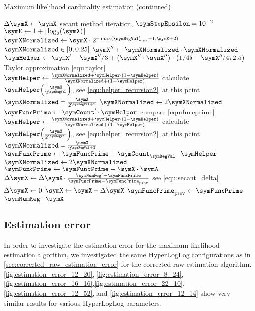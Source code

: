 \documentclass[a4paper]{scrartcl}
\begin{document}
\begin{algorithm}
\caption{Maximum likelihood cardinality estimation (continued)}
\begin{algorithmic}
\State $\Delta\symX \gets \symX$
\While{$\Delta\symX > \symX\cdot\symError$} \Comment secant method iteration, $\symStopEpsilon = 10^{-2}$
\State $\symE \gets 1+\lfloor\log_2(\symX)\rfloor$
\State $\symXNormalized \gets
\symX \cdot 2^{-\max(\symRegVal'_\text{max}+1, \symE+2)}$
\Comment $\symXNormalized \in [0, 0.25]$
\State $\symX''\gets \symXNormalized\cdot\symXNormalized$
\State $\symHelper \gets
\symX' - \symX''/3 + \left(\symX''\cdot \symX''\right)\cdot\left(1/45-\symX''/472.5\right)$
\Comment Taylor approximation \eqref{equ:taylor}
\State $\symHelper \gets \frac{\symXNormalized+\symHelper\cdot(1-\symHelper)}{\symXNormalized+(1-\symHelper)}$
\Comment calculate $\symHelper\!\left(\frac{\symX}{2^{\symRegVal}}\right)$, see \eqref{equ:helper_recursion2}, at this point $\symXNormalized = \frac{\symX}{2^{\symRegVal+2}}$
\State $\symXNormalized \gets 2\symXNormalized$
\EndFor
\State $\symFuncPrime \gets \symCount'\cdot\symHelper$
\Comment compare \eqref{equ:funcprime}
\State $\symHelper \gets \frac{\symXNormalized+\symHelper\cdot(1-\symHelper)}{\symXNormalized+(1-\symHelper)}$
\Comment calculate $\symHelper\!\left(\frac{\symX}{2^{\symRegVal}}\right)$, see \eqref{equ:helper_recursion2}, at this point $\symXNormalized = \frac{\symX}{2^{\symRegVal+2}}$
\State $\symFuncPrime\gets \symFuncPrime + \symCount_\symRegVal\cdot\symHelper$
\State $\symXNormalized \gets 2\symXNormalized$
\EndFor
\State $\symFuncPrime\gets \symFuncPrime + \symX\cdot\symA$
\State $\Delta\symX \gets \Delta\symX \cdot \frac{\symNumReg' - \symFuncPrime}{\symFuncPrime - \symFuncPrime_\text{prev}}$
\Comment see \eqref{equ:secant_delta}
\Else
\State $\Delta\symX \gets 0$
\EndIf
\State $\symX \gets \symX + \Delta\symX$
\State $\symFuncPrime_\text{prev}\gets \symFuncPrime$
\EndWhile
\State \Return $\symNumReg\cdot\symX$
\EndFunction
\end{algorithmic}
\end{algorithm}

\subsection{Estimation error}
\label{sec:maximum_likelihood_estimation_error}
In order to investigate the estimation error for the maximum likelihood estimation algorithm, we investigated the same HyperLogLog configurations as in \cref{sec:corrected_raw_estimation_error} for the corrected raw estimation algorithm. \cref{fig:estimation_error_12_20}, \cref{fig:estimation_error_8_24}, \cref{fig:estimation_error_16_16},\cref{fig:estimation_error_22_10},\cref{fig:estimation_error_12_52}, and \cref{fig:estimation_error_12_14} show very similar results for various HyperLogLog parameters. 
\end{document}
